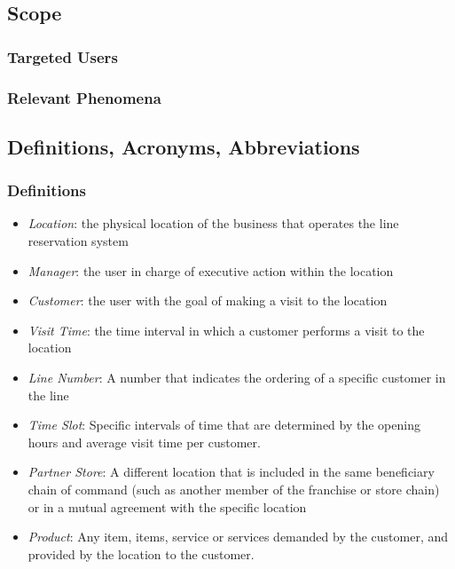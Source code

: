 

\subsection{Scope}
\subsubsection{Targeted Users}



\subsubsection{Relevant Phenomena}



\subsection{Definitions, Acronyms, Abbreviations}
\subsubsection{Definitions}
\begin{itemize}
    \item \textit{Location}: the physical location of the business that operates the line reservation system
    \item \textit{Manager}: the user in charge of executive action within the location
    \item \textit{Customer}: the user with the goal of making a visit to the location
    \item \textit{Visit Time}: the time interval in which a customer performs a visit to the location
    \item \textit{Line Number}: A number that indicates the ordering of a specific customer in the line
    \item \textit{Time Slot}: Specific intervals of time that are determined by the opening hours and average visit time per customer.
    \item \textit{Partner Store}: A different location that is included in the same beneficiary chain of command (such as another member of the franchise or store chain) or in a mutual agreement with the specific location
    \item \textit{Product}: Any item, items, service or services demanded by the customer, and provided by the location to the customer.
\end{itemize}
